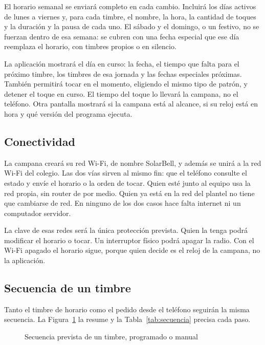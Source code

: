 \documentclass[12pt,letterpaper]{article}
\begin{document}
El horario semanal se enviará completo en cada cambio. Incluirá los días activos de lunes a viernes y, para cada timbre, el nombre, la hora, la cantidad de toques y la duración y la pausa de cada uno. El sábado y el domingo, o un festivo, no se fuerzan dentro de esa semana: se cubren con una fecha especial que ese día reemplaza el horario, con timbres propios o en silencio.

La aplicación mostrará el día en curso: la fecha, el tiempo que falta para el próximo timbre, los timbres de esa jornada y las fechas especiales próximas. También permitirá tocar en el momento, eligiendo el mismo tipo de patrón, y detener el toque en curso. El tiempo del toque lo llevará la campana, no el teléfono. Otra pantalla mostrará si la campana está al alcance, si su reloj está en hora y qué versión del programa ejecuta.

\subsection*{Conectividad}

La campana creará su red Wi-Fi, de nombre SolarBell, y además se unirá a la red Wi-Fi del colegio. Las dos vías sirven al mismo fin: que el teléfono consulte el estado y envíe el horario o la orden de tocar. Quien esté junto al equipo usa la red propia, sin router de por medio. Quien ya está en la red del plantel no tiene que cambiarse de red. En ninguno de los dos casos hace falta internet ni un computador servidor.

La clave de esas redes será la única protección prevista. Quien la tenga podrá modificar el horario o tocar. Un interruptor físico podrá apagar la radio. Con el Wi-Fi apagado el horario sigue, porque quien decide es el reloj de la campana, no la aplicación.

\subsection*{Secuencia de un timbre}

Tanto el timbre de horario como el pedido desde el teléfono seguirán la misma secuencia. La Figura~\ref{fig:secuencia} la resume y la Tabla~\ref{tab:secuencia} precisa cada paso.

\begin{figure}[H]
\centering
\singlespacing
{}
\caption{Secuencia prevista de un timbre, programado o manual}
\label{fig:secuencia}
\end{figure}
\end{document}
